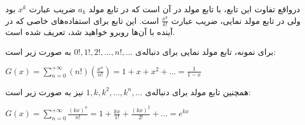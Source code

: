 درواقع تفاوت این تابع، با تابع مولد در آن است که در تابع مولد
$a_k$
ضریب عبارت
$x^k$
بود ولی در تابع مولد نمایی، ضریب عبارت
$\frac{x^k}{k!}$
است.
این تابع برای
استفاده‌های خاصی که در آینده با آن‌ها روبرو خواهید شد،
تعریف شده است.


برای نمونه،
تابع مولد نمایی برای دنباله‌ی 
$0!, 1!, 2!, ..., n!, ...$ 
به صورت زیر است:
\begin{center}
    $G(x)= \sum\limits_{n=0}^{+\infty} (n!)(\frac{x^{n}}{n!}) 
    = 1 + x + x^{2} + ... = \frac{1}{1-x}$		
\end{center}

همچنین تابع مولد برای دنباله‌ی 
$1, k, k^{2}, ..., k^{n}, ...$
نیز به صورت زیر است: 
\begin{center}
    $G(x)= \sum\limits_{n=0}^{+\infty} \frac{(kx)^{n}}{n!} 
    = 1 + \frac{kx}{1!} + \frac{(kx)^{2}}{2!} + ... = e^{kx}$		
\end{center}	